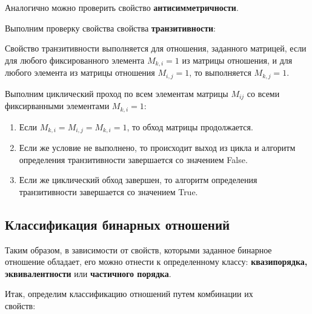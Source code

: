 \documentclass[bachelor, och, labwork]{shiza}
\begin{document}
Аналогично можно проверить свойство \textbf{антисимметричности}.

Выполним проверку свойства свойства \textbf{транзитивности}:

Свойство транзитивности выполняется для отношения, заданного матрицей, если для 
любого фиксированного элемента $M_{k,i}=1$ из матрицы отношения, и для любого
элемента из матрицы отношения $M_{i,j}=1$, то выполняется $M_{k,j}=1$.

Выполним циклический проход по всем элементам матрицы $M_{ij}$ со всеми
фиксирванными элементами $M_{k,i}=1$:

\begin{enumerate}
    
    \item Если $M_{k,i}=M_{i,j}=M_{k,i}=1$, то обход матрицы продолжается.
   
    \item Если же условие не выполнено, то происходит выход из цикла и алгоритм 
    определения транзитивности завершается со значением False.

    \item Если же циклический обход завершен, то алгоритм определения 
    транзитивности завершается со значением True.

\end{enumerate}

\subsection{Классификация бинарных отношений}

Таким образом, в зависимости от свойств, которыми заданное бинарное отношение
обладает, его можно отнести к определенному классу: \textbf{квазипорядка,
эквивалентности} или \textbf{частичного порядка}. 

Итак, определим классификацию отношений путем комбинации их \\свойств:
\end{document}
